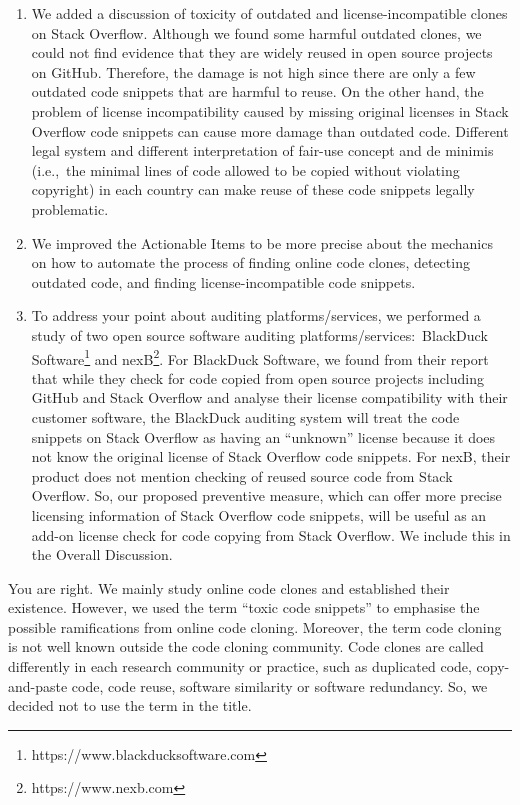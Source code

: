 \documentclass[a4paper,twoside,10pt]{reviewresponse}
\begin{document}
\begin{enumerate} \item We added a discussion of toxicity of outdated and
	license-incompatible clones on Stack Overflow. Although we found some harmful
	outdated clones, we could not find evidence that they are widely reused in open
	source projects on GitHub. Therefore, the damage is not high since there are only
	a few outdated code snippets that are harmful to reuse. On the other hand, the
	problem of license incompatibility caused by missing original licenses in Stack
	Overflow code snippets can cause more damage than outdated code. Different legal
	system and different interpretation of fair-use concept and de minimis (i.e.,~the
	minimal lines of code allowed to be copied without violating copyright) in each
	country can make reuse of these code snippets legally problematic.
	
	\item We improved the Actionable Items to be more precise about the mechanics
	on how to automate the process of finding online code clones, detecting
	outdated code, and finding license-incompatible code snippets.
	
	\item To address your point about auditing platforms/services, we performed a
	study of two open source software auditing platforms/services:~BlackDuck
	Software\footnote{https://www.blackducksoftware.com} and
	nexB\footnote{https://www.nexb.com}. For BlackDuck Software, we found from
	their report~\cite{CORSI2017} that while they check for code copied from open
	source projects including GitHub and Stack Overflow and analyse their license
	compatibility with their customer software, the BlackDuck auditing system will
	treat the code snippets on Stack Overflow as having an ``unknown'' license because
	it does not know the original license of Stack Overflow code snippets. For
	nexB, their product does not mention checking of reused source code from Stack
	Overflow. So, our proposed preventive measure, which can offer more precise
	licensing information of Stack Overflow code snippets, will be useful as an
	add-on license check for code copying from Stack Overflow. We include this in
	the Overall Discussion. \end{enumerate}


You are right. We mainly study online code clones and established their
existence. However, we used the term ``toxic code snippets'' to
emphasise the possible ramifications from online code cloning. Moreover, the
term code cloning is not well known outside the code cloning community. Code
clones are called differently in each research community or practice, such as
duplicated code, copy-and-paste code, code reuse, software similarity or
software redundancy. So, we decided not to use the term in the title.
\end{document}
